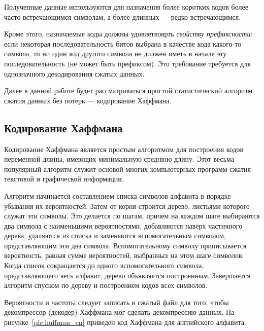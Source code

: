 Полученные данные используются для назначения более коротких кодов 
более часто встречающимся символам, а более длинных --- редко встречающимся.

Кроме этого, назначаемые коды должны удовлетвоярть \textit{свойству префиксности}:
если некоторая последовательность битов выбрана в качестве кода
какого-то символа, то ни один код другого символа не должен иметь
в начале эту последовательность (не может быть префиксом).
Это требование требуется для однозначного декодирования сжатых данных.

Далее в данной работе будет рассматриваться простой статистический
алгоритм сжатия данных без потерь --- кодирование Хаффмана.

\subsection{Кодирование Хаффмана}
\label{ssec:huffman_encode}

Кодирование Хаффмана является простым алгоритмом для построения
кодов переменной длины, имеющих минимальную среднюю длину.
Этот весьма популярный алгоритм служит основой многих компьютерных программ
сжатия текстовой и графической информации.

Алгоритм начинается составлением списка символов алфавита в
порядке убывания их вероятностей. Затем от корня строится дерево,
листьями которого служат эти символы. Это делается по шагам,
причем на каждом шаге выбираются два символа с наименьшими
вероятностями, добавляются наверх частичного дерева, удаляются
из списка и заменяются вспомогательным символом, представляющим
эти два символа. Вспомогательному символу приписывается
вероятность, равная сумме вероятностей, выбранных на этом 
шаге символов. Когда список сокращается до одного вспомогательного символа,
представляющего весь алфавит, дерево объявляется
построенным.
Завершается алгоритм спуском по дереву и построением кодов всех символов.

Вероятности и частоты следует записать в сжатый файл для того,
чтобы декомпрессор (декодер) Хаффмана мог сделать декомпрессию данных.
На рисунке~\ref{pic:huffman_en} приведен код Хаффмана для английского алфавита.

